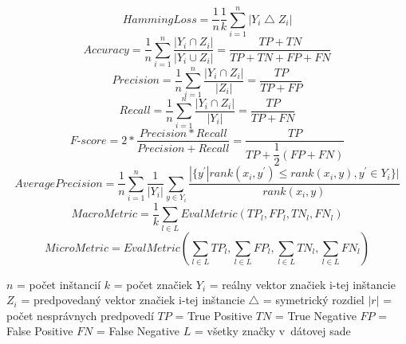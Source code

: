 \begin{equation}
	HammingLoss =  \dfrac{1}{n} \dfrac{1}{k} \sum_{i=1}^{n} | Y_{i} \bigtriangleup Z_{i} | \label{rovnica1}
\end{equation}
\begin{equation}
	Accuracy =  \dfrac{1}{n}  \sum_{i=1}^{n} \dfrac{| Y_{i} \cap Z_{i} |} {| Y_{i} \cup Z_{i} |} = \dfrac{TP + TN}{TP + TN + FP + FN} \label{rovnica2}
\end{equation}
\begin{equation}
	Precision =  \dfrac{1}{n}  \sum_{i=1}^{n} \dfrac{| Y_{i} \cap Z_{i} |} {| Z_{i} |} = \dfrac{TP}{TP + FP} \label{rovnica3}
\end{equation}
\begin{equation}
	Recall =  \dfrac{1}{n}  \sum_{i=1}^{n} \dfrac{| Y_{i} \cap Z_{i} |} {| Y_{i} |} = \dfrac{TP}{TP + FN} \label{rovnica4}
\end{equation}
\begin{equation}
	\textit{F-score} =  2* \dfrac{Precision*Recall}{Precision+Recall} =  \dfrac{TP}{TP + \dfrac{1}{2} (FP + FN)} \label{rovnica5}
\end{equation}
\begin{equation}
	AveragePrecision = \dfrac{1}{n}  \sum_{i=1}^{n} \dfrac{1}{| Y_{i} |} \sum_{y \in Y_{i}} 
	\dfrac{| \{ y^{'}|rank(x_{i},y^{'}) \leq rank(x_{i},y), y^{'} \in  Y_{i} \}|} {rank(x_{i},y)} \label{rovnica6}
\end{equation}
\begin{equation}
	MacroMetric =  \dfrac{1}{k} \sum_{l \in L} EvalMetric(TP_{l},FP_{l},TN_{l},FN_{l})  \label{rovnica7}
\end{equation}
\begin{equation}
	MicroMetric =  EvalMetric( \sum_{l \in L} TP_{l}, \sum_{l \in L} FP_{l}, \sum_{l \in L} TN_{l}, \sum_{l \in L} FN_{l} )  \label{rovnica8}
\end{equation}


\noindent\(n\) = počet inštancií \newline
\(k\) = počet značiek  \newline
\(Y_{i}\) = reálny vektor značiek i-tej inštancie  \newline
\(Z_{i}\) = predpovedaný vektor značiek i-tej inštancie \newline
\(\bigtriangleup\) = symetrický rozdiel  \newline
\(|r|\) = počet nesprávnych predpovedí \newline
\(TP\) = True Positive \newline
\(TN\) = True Negative \newline
\(FP\) = False Positive \newline
\(FN\) = False Negative \newline
\(L\) = všetky značky v~dátovej sade  \newline



